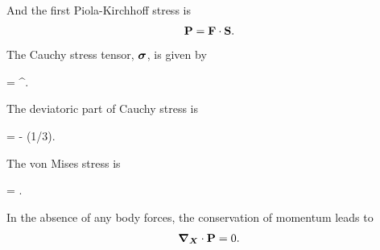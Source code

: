 And the first Piola-Kirchhoff stress is
\begin{gather}
    \mathbf{P} = \mathbf{F} \cdot  \mathbf{S}  \label{eq:P_tensor}.
\end{gather}
The Cauchy stress tensor, $\bm{\sigma}$, is given by 
\begin{nonumbereq}\CS =  \F \cdot  \PKS  \cdot  \F^\T.
\end{nonumbereq} The deviatoric part of Cauchy stress is \begin{nonumbereq}\DCS = \CS - (1/3)\tr{\CS}\I.
\end{nonumbereq}
The von Mises stress is 
\begin{nonumbereq}
    \sigmaeff = . 
\end{nonumbereq}

In the absence of any body forces, the conservation of momentum leads to 
\begin{gather}
\bm{\nabla}_{\bm{X}} \cdot \mathbf{P} = 0.
\end{gather}

